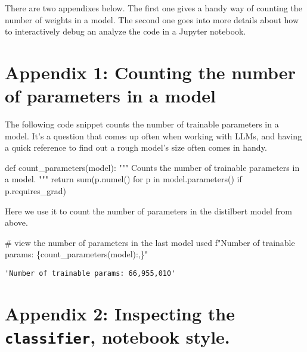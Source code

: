 \documentclass[
  letterpaper,
  DIV=11,
  numbers=noendperiod]{scrartcl}
\newenvironment{Shaded}{\begin{snugshade}}{\end{snugshade}}
\newcommand{\BuiltInTok}[1]{\textcolor[rgb]{0.00,0.23,0.31}{#1}}
\newcommand{\CommentTok}[1]{\textcolor[rgb]{0.37,0.37,0.37}{#1}}
\newcommand{\ControlFlowTok}[1]{\textcolor[rgb]{0.00,0.23,0.31}{#1}}
\newcommand{\KeywordTok}[1]{\textcolor[rgb]{0.00,0.23,0.31}{#1}}
\newcommand{\NormalTok}[1]{\textcolor[rgb]{0.00,0.23,0.31}{#1}}
\newcommand{\SpecialCharTok}[1]{\textcolor[rgb]{0.37,0.37,0.37}{#1}}
\newcommand{\SpecialStringTok}[1]{\textcolor[rgb]{0.13,0.47,0.30}{#1}}
\begin{document}
There are two appendixes below. The first one gives a handy way of
counting the number of weights in a model. The second one goes into more
details about how to interactively debug an analyze the code in a
Jupyter notebook.

\section{Appendix 1: Counting the number of parameters in a
model}\label{appendix-1-counting-the-number-of-parameters-in-a-model}

The following code snippet counts the number of trainable parameters in
a model. It's a question that comes up often when working with LLMs, and
having a quick reference to find out a rough model's size often comes in
handy.

\begin{Shaded}
\begin{Highlighting}[]
\KeywordTok{def}\NormalTok{ count\_parameters(model):}
    \CommentTok{"""}
\CommentTok{    Counts the number of trainable parameters in a \textasciigrave{}model\textasciigrave{}.}
\CommentTok{    """}
    \ControlFlowTok{return} \BuiltInTok{sum}\NormalTok{(p.numel() }\ControlFlowTok{for}\NormalTok{ p }\KeywordTok{in}\NormalTok{ model.parameters() }\ControlFlowTok{if}\NormalTok{ p.requires\_grad)}
\end{Highlighting}
\end{Shaded}

Here we use it to count the number of parameters in the distilbert model
from above.

\begin{Shaded}
\begin{Highlighting}[]
\CommentTok{\# view the number of parameters in the last model used}
\SpecialStringTok{f"Number of trainable params: }\SpecialCharTok{\{}\NormalTok{count\_parameters(model)}\SpecialCharTok{:,\}}\SpecialStringTok{"}
\end{Highlighting}
\end{Shaded}

\begin{verbatim}
'Number of trainable params: 66,955,010'
\end{verbatim}

\section{\texorpdfstring{Appendix 2: Inspecting the \texttt{classifier},
notebook
style.}{Appendix 2: Inspecting the classifier, notebook style.}}\label{appendix-2-inspecting-the-classifier-notebook-style.}
\end{document}
